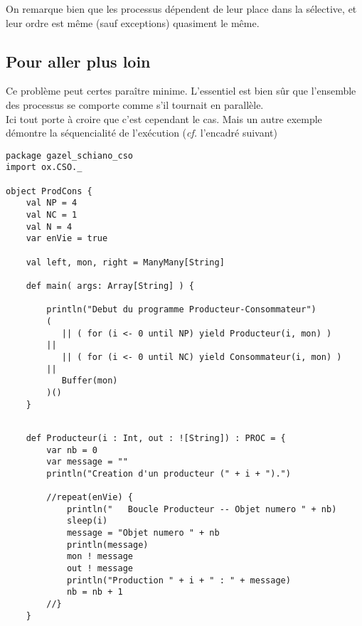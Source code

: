 \documentclass[a4paper,11pt,french]{report}
\begin{document}
On remarque bien que les processus dépendent de leur place dans la sélective, et leur ordre est même (sauf exceptions) quasiment le même.

\subsection{Pour aller plus loin}

Ce problème peut certes paraître minime. L'essentiel est bien sûr que l'ensemble des processus se comporte comme s'il tournait en parallèle.\\ Ici tout porte à croire que c'est cependant le cas. Mais un autre exemple démontre la séquencialité de l'exécution (\emph{cf.} l'encadré suivant)

\begin{lstlisting}[frame=trBL, title={Contre-exemple démontrant la séquentialité de l'exécution}]
package gazel_schiano_cso
import ox.CSO._

object ProdCons {
    val NP = 4
    val NC = 1
    val N = 4
    var enVie = true

    val left, mon, right = ManyMany[String]

    def main( args: Array[String] ) {
        
        println("Debut du programme Producteur-Consommateur")
        ( 
           || ( for (i <- 0 until NP) yield Producteur(i, mon) )
        || 
           || ( for (i <- 0 until NC) yield Consommateur(i, mon) )
        || 
           Buffer(mon) 
        )()
    }
\end{lstlisting}
\begin{lstlisting}[frame=trBL, title={Contre-exemple, suite : Producteur}, firstnumber=last]    
    
    def Producteur(i : Int, out : ![String]) : PROC = {
        var nb = 0
        var message = ""
        println("Creation d'un producteur (" + i + ").")
        
        //repeat(enVie) {
            println("   Boucle Producteur -- Objet numero " + nb)
            sleep(i)
            message = "Objet numero " + nb
            println(message)
            mon ! message
            out ! message
            println("Production " + i + " : " + message)
            nb = nb + 1
        //}
    }
\end{lstlisting}
\end{document}
